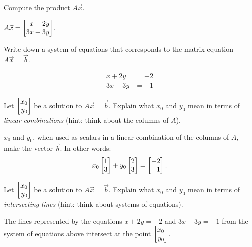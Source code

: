 \documentclass{problemset}
\begin{document}
	\begin{parts}
		\item Compute the product $A\vec x$.
			\begin{solution}
				$A \vec x = \mat{x+2y\\3x+3y}$.
			\end{solution}
		\item Write down a system of equations that corresponds to the matrix equation
			$A\vec x=\vec b$.
			\begin{solution}
				\begin{align*}
					x + 2y &= -2 \\
					3x + 3y &= -1
				\end{align*}
			\end{solution}
		\item Let $\mat{x_0\\y_0}$ be a solution to $A\vec x=\vec b$. Explain what
			$x_0$ and $y_0$ mean in terms of \emph{linear combinations} (hint: think
			about the columns of $A$).
			\begin{solution}
				$x_0$ and $y_0$, when used as scalars in a linear combination of
				the columns of $A$, make the vector $\vec b$. In other words:
				\[
					x_0 \mat{1\\3} + y_0 \mat{2\\3} = \mat{-2\\-1}.
				\]
			\end{solution}
		\item Let $\mat{x_0\\y_0}$ be a solution to $A\vec x=\vec b$. Explain what
			$x_0$ and $y_0$ mean in terms of \emph{intersecting lines} (hint: think
			about systems of equations).
			\begin{solution}
				The lines represented by the equations $x+2y=-2$ and $3x+3y=-1$
				from the system of equations above intersect at the point $\mat{x_0\\y_0}$.
			\end{solution}
	\end{parts}
\end{document}
